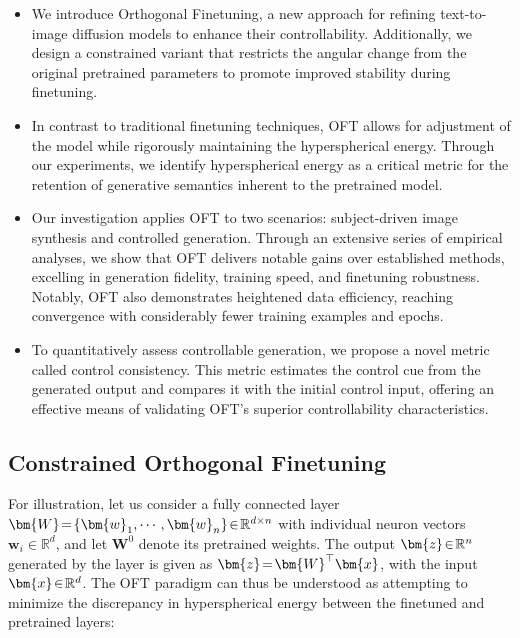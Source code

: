 \begin{itemize}[leftmargin=*,nosep]
    \item We introduce Orthogonal Finetuning, a new approach for refining text-to-image diffusion models to enhance their controllability. Additionally, we design a constrained variant that restricts the angular change from the original pretrained parameters to promote improved stability during finetuning.
    \item In contrast to traditional finetuning techniques, OFT allows for adjustment of the model while rigorously maintaining the hyperspherical energy. Through our experiments, we identify hyperspherical energy as a critical metric for the retention of generative semantics inherent to the pretrained model.
    \item Our investigation applies OFT to two scenarios: subject-driven image synthesis and controlled generation. Through an extensive series of empirical analyses, we show that OFT delivers notable gains over established methods, excelling in generation fidelity, training speed, and finetuning robustness. Notably, OFT also demonstrates heightened data efficiency, reaching convergence with considerably fewer training examples and epochs.
    \item To quantitatively assess controllable generation, we propose a novel metric called control consistency. This metric estimates the control cue from the generated output and compares it with the initial control input, offering an effective means of validating OFT’s superior controllability characteristics.
\end{itemize}



\subsection{Constrained Orthogonal Finetuning}

For illustration, let us consider a fully connected layer $\thickmuskip=2mu \medmuskip=2mu \bm{W}=\{\bm{w}_1,\cdots,\bm{w}_n\}\in\mathbb{R}^{d\times n}$ with individual neuron vectors $\bm{w}_i\in\mathbb{R}^{d}$, and let $\bm{W}^0$ denote its pretrained weights. The output $\thickmuskip=2mu \medmuskip=2mu \bm{z}\in\mathbb{R}^n$ generated by the layer is given as $\thickmuskip=2mu \medmuskip=2mu \bm{z}=\bm{W}^\top\bm{x}$, with the input $\thickmuskip=2mu \medmuskip=2mu \bm{x}\in\mathbb{R}^d$. The OFT paradigm can thus be understood as attempting to minimize the discrepancy in hyperspherical energy between the finetuned and pretrained layers:

